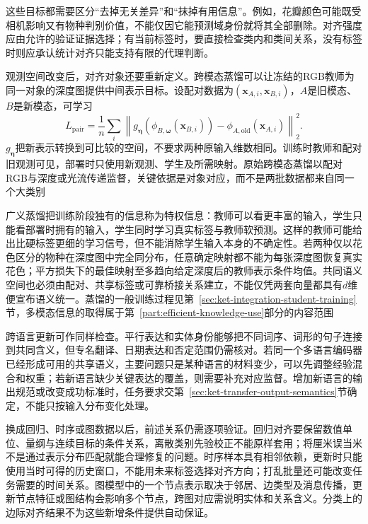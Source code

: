 这些目标都需要区分“去掉无关差异”和“抹掉有用信息”。例如，花瓣颜色可能既受相机影响又有物种判别价值，不能仅因它能预测域身份就将其全部删除。对齐强度应由允许的验证证据选择；有当前标签时，要直接检查类内和类间关系，没有标签时则应承认统计对齐只能支持有限的代理判断。

观测空间改变后，对齐对象还要重新定义。跨模态蒸馏可以让冻结的RGB教师为同一对象的深度图提供中间表示目标。设配对数据为$(\bm x_{A,i},\bm x_{B,i})$，$A$是旧模态、$B$是新模态，可学习
\begin{equation}
L_{\mathrm{pair}}
=\frac1n\sum_i
\left\lVert g_{\bm\eta}(\phi_{B,\bm\omega}(\bm x_{B,i}))
-\phi_{A,\mathrm{old}}(\bm x_{A,i})\right\rVert_2^2.
\label{eq:ket-update-crossmodal}
\end{equation}
$g_{\bm\eta}$把新表示转换到可比较的空间，不要求两种原输入维数相同。训练时教师和配对旧观测可见，部署时只使用新观测、学生及所需映射。原始跨模态蒸馏以配对RGB与深度或光流传递监督，关键依据是对象对应，而不是两批数据都来自同一个大类别

广义蒸馏把训练阶段独有的信息称为特权信息：教师可以看更丰富的输入，学生只能看部署时拥有的输入，学生同时学习真实标签与教师软预测。这样的教师可能给出比硬标签更细的学习信号，但不能消除学生输入本身的不确定性。若两种仅以花色区分的物种在深度图中完全同分布，任意确定映射都不能为每张深度图恢复真实花色；平方损失下的最佳映射至多趋向给定深度后的教师表示条件均值。共同语义空间也必须由配对、共享标签或可靠桥接关系建立，不能仅凭两套向量都具有$d$维便宣布语义统一。蒸馏的一般训练过程见第~\ref{sec:ket-integration-student-training}节，多模态信息的取得属于第~\ref{part:efficient-knowledge-use}部分的内容范围

跨语言更新可作同样检查。平行表达和实体身份能够把不同词序、词形的句子连接到共同含义，但专名翻译、日期表达和否定范围仍需核对。若同一个多语言编码器已经形成可用的共享语义，主要问题只是某种语言的材料变少，可以先调整经验混合和权重；若新语言缺少关键表达的覆盖，则需要补充对应监督。增加新语言的输出规范或改变成功标准时，任务要求交第~\ref{sec:ket-transfer-output-semantics}节确定，不能只按输入分布变化处理。

换成回归、时序或图数据以后，前述关系仍需逐项验证。回归对齐要保留数值单位、量纲与连续目标的条件关系，离散类别先验校正不能原样套用；将厘米误当米不是通过表示分布匹配就能合理修复的问题。时序样本具有相邻依赖，更新时只能使用当时可得的历史窗口，不能用未来标签选择对齐方向；打乱批量还可能改变任务需要的时间关系。图模型中的一个节点表示取决于邻居、边类型及消息传播，更新节点特征或图结构会影响多个节点，跨图对应需说明实体和关系含义。分类上的边际对齐结果不为这些新增条件提供自动保证。

